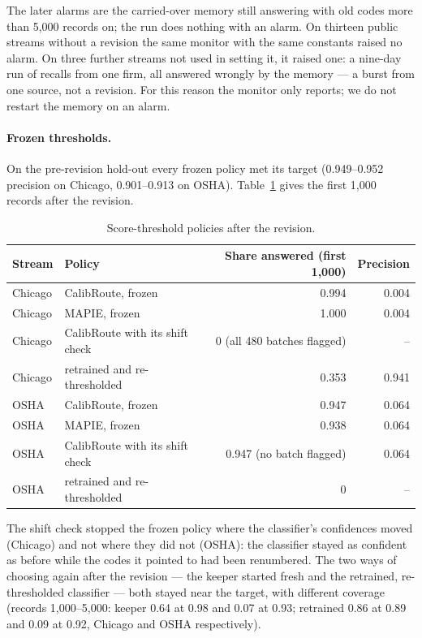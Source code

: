 \documentclass[11pt]{article}
\begin{document}
The later alarms are the carried-over memory still answering with old codes more than 5{,}000 records on; the run does
nothing with an alarm. On thirteen public streams without a revision the same monitor with the same constants raised no
alarm. On three further streams not used in setting it, it raised one: a nine-day run of recalls from one firm, all
answered wrongly by the memory --- a burst from one source, not a revision. For this reason the monitor only reports; we
do not restart the memory on an alarm.

\paragraph{Frozen thresholds.} On the pre-revision hold-out every frozen policy met its target (0.949--0.952 precision
on Chicago, 0.901--0.913 on OSHA). Table~\ref{tab:frozen} gives the first 1{,}000 records after the revision.

\begin{table}[h]
\centering
\caption{Score-threshold policies after the revision.}
\label{tab:frozen}
\begin{tabular}{llrr}
\toprule
Stream & Policy & Share answered (first 1{,}000) & Precision \\
\midrule
Chicago & CalibRoute, frozen & 0.994 & 0.004 \\
Chicago & MAPIE, frozen & 1.000 & 0.004 \\
Chicago & CalibRoute with its shift check & 0 (all 480 batches flagged) & -- \\
Chicago & retrained and re-thresholded & 0.353 & 0.941 \\
OSHA & CalibRoute, frozen & 0.947 & 0.064 \\
OSHA & MAPIE, frozen & 0.938 & 0.064 \\
OSHA & CalibRoute with its shift check & 0.947 (no batch flagged) & 0.064 \\
OSHA & retrained and re-thresholded & 0 & -- \\
\bottomrule
\end{tabular}
\end{table}

The shift check stopped the frozen policy where the classifier's confidences moved (Chicago) and not where they did not
(OSHA): the classifier stayed as confident as before while the codes it pointed to had been renumbered. The two ways of
choosing again after the revision --- the keeper started fresh and the retrained, re-thresholded classifier --- both
stayed near the target, with different coverage (records 1{,}000--5{,}000: keeper 0.64 at 0.98 and 0.07 at 0.93;
retrained 0.86 at 0.89 and 0.09 at 0.92, Chicago and OSHA respectively).
\end{document}
